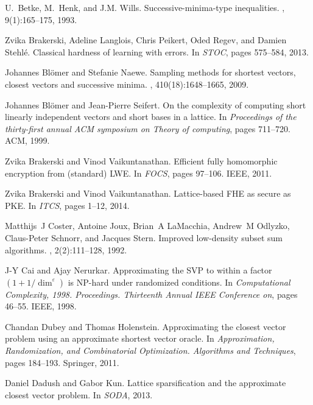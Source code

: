 \documentclass[11pt]{article}
\newcommand{\eps}{\varepsilon}
\begin{document}
\begin{thebibliography}{DKRS03}
U.~Betke, M.~Henk, and J.M. Wills.
\newblock Successive-minima-type inequalities.
, 9(1):165--175, 1993.

Zvika Brakerski, Adeline Langlois, Chris Peikert, Oded Regev, and Damien
  Stehl{\'e}.
\newblock Classical hardness of learning with errors.
\newblock In {\em STOC}, pages 575--584, 2013.

Johannes Bl{\"o}mer and Stefanie Naewe.
\newblock Sampling methods for shortest vectors, closest vectors and successive
  minima.
, 410(18):1648--1665, 2009.

Johannes Bl{\"o}mer and Jean-Pierre Seifert.
\newblock On the complexity of computing short linearly independent vectors and
  short bases in a lattice.
\newblock In {\em Proceedings of the thirty-first annual ACM symposium on
  Theory of computing}, pages 711--720. ACM, 1999.

Zvika Brakerski and Vinod Vaikuntanathan.
\newblock Efficient fully homomorphic encryption from (standard) {LWE}.
\newblock In {\em FOCS}, pages 97--106. IEEE, 2011.

Zvika Brakerski and Vinod Vaikuntanathan.
\newblock Lattice-based {FHE} as secure as {PKE}.
\newblock In {\em ITCS}, pages 1--12, 2014.

Matthijs~J Coster, Antoine Joux, Brian~A LaMacchia, Andrew~M Odlyzko,
  Claus-Peter Schnorr, and Jacques Stern.
\newblock Improved low-density subset sum algorithms.
, 2(2):111--128, 1992.

J-Y Cai and Ajay Nerurkar.
\newblock Approximating the {SVP} to within a factor $(1+1/\dim^\eps)$ is
  {NP}-hard under randomized conditions.
\newblock In {\em Computational Complexity, 1998. Proceedings. Thirteenth
  Annual IEEE Conference on}, pages 46--55. IEEE, 1998.

Chandan Dubey and Thomas Holenstein.
\newblock Approximating the closest vector problem using an approximate
  shortest vector oracle.
\newblock In {\em Approximation, Randomization, and Combinatorial Optimization.
  Algorithms and Techniques}, pages 184--193. Springer, 2011.

Daniel Dadush and Gabor Kun.
\newblock Lattice sparsification and the approximate closest vector problem.
\newblock In {\em SODA}, 2013.


\end{thebibliography}
\end{document}
